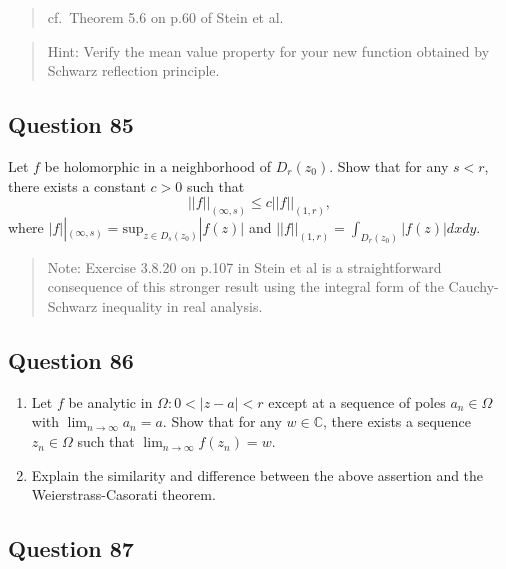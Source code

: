 \documentclass[12pt]{article}
\begin{document}
\begin{quote}
cf.~Theorem 5.6 on p.60 of Stein et al.
\end{quote}

\begin{quote}
Hint: Verify the mean value property for your new function obtained by
Schwarz reflection principle.
\end{quote}

\hypertarget{question-85-2}{%
\subsection{Question 85}\label{question-85-2}}

Let \(f\) be holomorphic in a neighborhood of \(D_r(z_0)\). Show that
for any \(s<r\), there exists a constant \(c>0\) such that
\[||f||_{(\infty, s)} \leq c ||f||_{(1, r)},\] where
\(\displaystyle |f||_{(\infty, s)} = \text{sup}_{z \in D_s(z_0)}|f(z)|\)
and \(\displaystyle ||f||_{(1, r)} = \int_{D_r(z_0)} |f(z)|dx dy\).

\begin{quote}
Note: Exercise 3.8.20 on p.107 in Stein et al is a straightforward
consequence of this stronger result using the integral form of the
Cauchy-Schwarz inequality in real analysis.
\end{quote}

\hypertarget{question-86-1}{%
\subsection{Question 86}\label{question-86-1}}

\begin{enumerate}
\def\labelenumi{(\arabic{enumi})}
\item
  Let \(f\) be analytic in \(\Omega: 0<|z-a|<r\) except at a sequence of
  poles \(a_n \in \Omega\) with \(\lim_{n \rightarrow \infty} a_n = a\).
  Show that for any \(w \in \mathbb C\), there exists a sequence
  \(z_n \in \Omega\) such that
  \(\lim_{n \rightarrow \infty} f(z_n) = w\).
\item
  Explain the similarity and difference between the above assertion and
  the Weierstrass-Casorati theorem.
\end{enumerate}

\hypertarget{question-87-1}{%
\subsection{Question 87}\label{question-87-1}}
\end{document}
